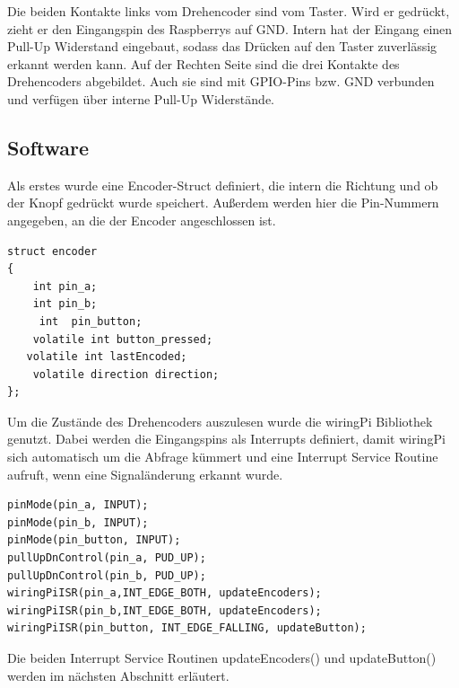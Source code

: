 Die beiden Kontakte links vom Drehencoder sind vom Taster. Wird er gedrückt, zieht er den Eingangspin des Raspberrys auf GND. Intern hat der Eingang einen Pull-Up Widerstand eingebaut, sodass das Drücken auf den Taster zuverlässig erkannt werden kann.
Auf der Rechten Seite sind die drei Kontakte des Drehencoders abgebildet. Auch sie sind mit GPIO-Pins bzw. GND verbunden und verfügen über interne Pull-Up Widerstände.

\subsection{Software}
Als erstes wurde eine Encoder-Struct definiert, die intern die Richtung und ob der Knopf gedrückt wurde speichert. Außerdem werden hier die Pin-Nummern angegeben, an die der Encoder angeschlossen ist.
\begin{lstlisting}[label=struct_encoder,caption=Encoder Struct]
struct encoder
{
    int pin_a;
    int pin_b;
	 int  pin_button;
	volatile int button_pressed;
   volatile int lastEncoded;
	volatile direction direction;
};
\end{lstlisting}

Um die Zustände des Drehencoders auszulesen wurde die wiringPi Bibliothek genutzt. 
\newline
Dabei werden die Eingangspins als Interrupts definiert, damit wiringPi sich automatisch um die Abfrage kümmert und eine Interrupt Service Routine aufruft, wenn eine Signaländerung erkannt wurde.

\begin{lstlisting}[label=encoder_init,caption=Encoder Initialiserung]
pinMode(pin_a, INPUT);
pinMode(pin_b, INPUT);
pinMode(pin_button, INPUT);
pullUpDnControl(pin_a, PUD_UP);
pullUpDnControl(pin_b, PUD_UP);
wiringPiISR(pin_a,INT_EDGE_BOTH, updateEncoders);
wiringPiISR(pin_b,INT_EDGE_BOTH, updateEncoders);
wiringPiISR(pin_button, INT_EDGE_FALLING, updateButton);
\end{lstlisting}

Die beiden Interrupt Service Routinen updateEncoders() und updateButton() werden im nächsten Abschnitt erläutert.

